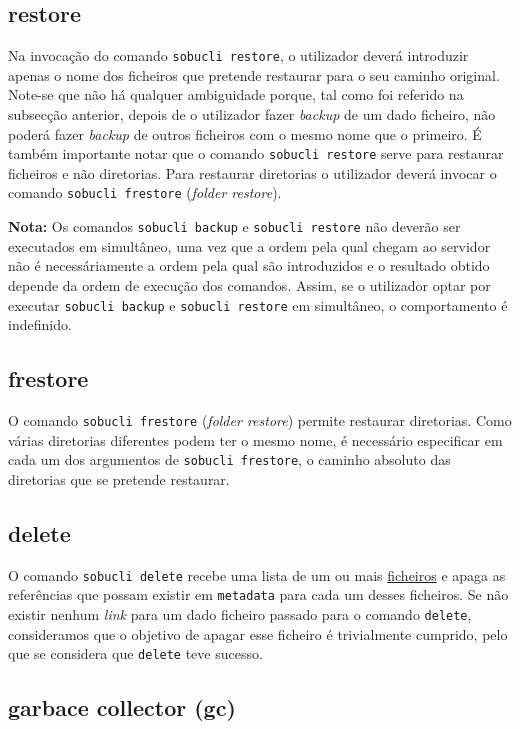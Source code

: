 \documentclass[a4paper,12pt,titlepage,draft,portuguese]{article}
\begin{document}
\subsection{restore}

Na invocação do comando \texttt{sobucli restore}, o utilizador deverá introduzir apenas o nome dos ficheiros que pretende restaurar para o seu caminho original. Note-se que não há qualquer ambiguidade porque, tal como foi referido na subsecção anterior, depois de o utilizador fazer \emph{backup} de um dado ficheiro, não poderá fazer \emph{backup} de outros ficheiros com o mesmo nome que o primeiro. É também importante notar que o comando \texttt{sobucli restore} serve para restaurar ficheiros e não diretorias. Para restaurar diretorias o utilizador deverá invocar o comando \texttt{sobucli frestore} (\emph{folder restore}).

\textbf{Nota:} Os comandos \texttt{sobucli backup} e \texttt{sobucli restore} não deverão ser executados em simultâneo, uma vez que a ordem pela qual chegam ao servidor não é necessáriamente a ordem pela qual são introduzidos e o resultado obtido depende da ordem de execução dos comandos. Assim, se o utilizador optar por executar \texttt{sobucli backup} e \texttt{sobucli restore} em simultâneo, o comportamento é indefinido.

\subsection{frestore}

O comando \texttt{sobucli frestore} (\emph{folder restore}) permite restaurar diretorias. Como várias diretorias diferentes podem ter o mesmo nome, é necessário especificar em cada um dos argumentos de \texttt{sobucli frestore}, o caminho absoluto das diretorias que se pretende restaurar.

\subsection{delete}

O comando \texttt{sobucli delete} recebe uma lista de um ou mais \underline{ficheiros} e apaga as referências que possam existir em \texttt{metadata\/} para cada um desses ficheiros. Se não existir nenhum \emph{link} para um dado ficheiro passado para o comando \texttt{delete}, consideramos que o objetivo de apagar esse ficheiro é trivialmente cumprido, pelo que se considera que \texttt{delete} teve sucesso.

\subsection{garbace collector (gc)}
\end{document}
